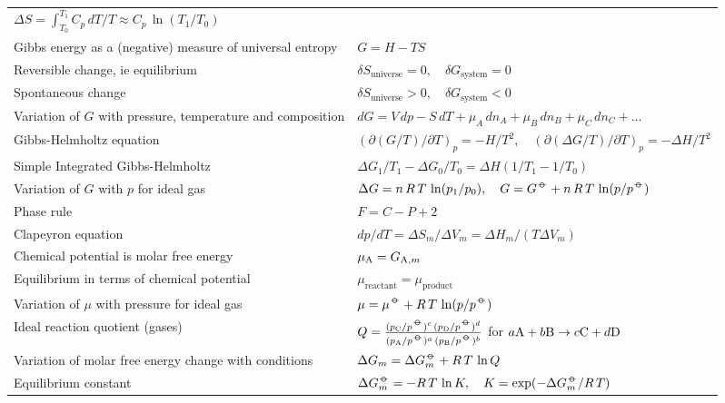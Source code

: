 \documentclass[a4paper, 11pt]{article}
\makeatletter
\DeclareRobustCommand{\ltsym}{{\mbox{%
\def\width{0.8pt}
\hbox to \width{\relax}%
\hbox to 0pt{\hbox to 0pt{\hss\(\circ\)\hss}%
\hbox to 0pt{\hss\(-\)\hss}%
}
\hbox to \width{\relax}%
}}}
\newenvironment{explain}{\color{explain}\def\arraystretch{1.6}\setlength{\tabcolsep}{.05\textwidth}\begin{longtable}{@{}p{.35\textwidth}p{.55\textwidth}}\raggedright}{\end{longtable}}
\makeatother
\begin{document}
\begin{explain}
$\Delta S = \int _{T_0}^{T_1} C_p\, dT/T
\approx
C_p\,\ln (T_1/T_0)$
\\
Gibbs energy as a (negative) measure of universal entropy
&
\color{memorise}
$G = H - T S$
\\
Reversible change, ie equilibrium
&
$\delta S_{\text{universe}} = 0, \quad \delta G_{\text{system}} = 0$
\\
Spontaneous change
&
$\delta S_{\text{universe}} > 0, \quad \delta G_{\text{system}} < 0$
\\
Variation of $G$ with pressure, temperature and composition
&
\color{memorise}
$dG=V\,dp-S\,dT+\mu_A\,dn_A+\mu_B\,dn_B+\mu_C\,dn_C+\dots$
\\
Gibbs-Helmholtz equation
&
\color{memorise}
$ ( \partial(G/T) / \partial T)_p = - H/T^2, \quad
 ( \partial(\Delta G/T) / \partial T)_p = - \Delta H/T^2$
\\
Simple Integrated Gibbs-Helmholtz 
&
$\Delta G_1/T_1
-\Delta G_0/T_0
= \Delta H (1/T_1-1/T_0)
$
\\
Variation of $G$ with $p$ for ideal gas
&
$\Delta G = n\,R\,T\,\ln (p_1/p_0),\quad
G = G^\ltsym + n\,R\,T\,\ln(p/p^\ltsym)$
\\
Phase rule
&
\color{memorise}
$F = C - P + 2$
\\
Clapeyron equation
&
$dp/dT = \Delta S_m/\Delta V_m = \Delta H_m / (T \Delta V_m)$
\\
Chemical potential is molar free energy
&
\color{memorise}
$\mu_{\text A} = G_{\text A,m}$
\\
Equilibrium in terms of chemical potential
&
$\mu_{\text{reactant}} = \mu_{\text{product}}$
\\
Variation of $\mu$ with pressure for ideal gas
&
\color{memorise}
$\mu = \mu^\ltsym + R\,T\,\ln (p/p^\ltsym)$
\\
Ideal reaction quotient (gases)
&
\color{memorise}
$
Q = \frac
{
(p_{\text C}/p^\ltsym)^c
\,
(p_{\text D}/p^\ltsym)^d
}{
(p_{\text A}/p^\ltsym)^a
\,
(p_{\text B}/p^\ltsym)^b
}$ for 
$a\text A + b\text B \rightarrow c\text C+d\text D$
\\
Variation of molar free energy change with conditions
&
\color{memorise}
$\Delta G_m = \Delta G^\ltsym_m + R\,T\,\ln Q
$
\\
Equilibrium constant
&
\color{memorise}
$
\Delta G^\ltsym_m = - R\,T\,\ln K,\quad
K = \exp(-\Delta G^\ltsym_m / R\,T)
$

\end{explain}
\end{document}
